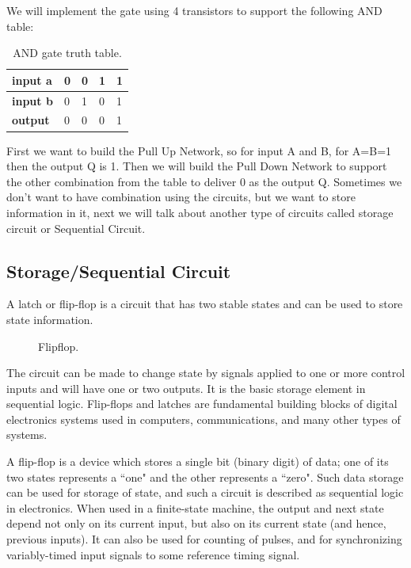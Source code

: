 We will implement the gate using 4 transistors to support the following AND
table:

\begin{table}[!ht]
    \centering
    \caption{AND gate truth table.}
    \begin{tabular}{lllll}
        \toprule
        \textbf{input a} & 0 & 0 & 1 & 1 \\ \midrule \textbf{input b} & 0 & 1 &
        0 & 1 \\ \midrule \textbf{output}  & 0 & 0 & 0 & 1 \\ \bottomrule
    \end{tabular}
\end{table}

First we want to build the Pull Up Network, so for input A and B, for A=B=1 then
the output Q is 1. Then we will build the Pull Down Network to support the other
combination from the table to deliver 0 as the output Q. Sometimes we don't want
to have combination using the circuits, but we want to store information in it,
next we will talk about another type of circuits called storage circuit or
Sequential Circuit.

\subsection{ Storage/Sequential Circuit }

A latch or flip-flop is a circuit that has two stable states and can be used to
store state information. 
\begin{figure}[!ht]
    \centering
    
    \caption{Flipflop.} \label{fig:flipflop}
\end{figure}

The circuit can be made to change state by signals applied to one or more
control inputs and will have one or two outputs. It is the basic storage element
in sequential logic. Flip-flops and latches are fundamental building blocks of
digital electronics systems used in computers, communications, and many other
types of systems.

A flip-flop is a device which stores a single bit (binary digit) of data; one of
its two states represents a ``one" and the other represents a ``zero". Such data
storage can be used for storage of state, and such a circuit is described as
sequential logic in electronics. When used in a finite-state machine, the output
and next state depend not only on its current input, but also on its current
state (and hence, previous inputs). It can also be used for counting of pulses,
and for synchronizing variably-timed input signals to some reference timing
signal.

